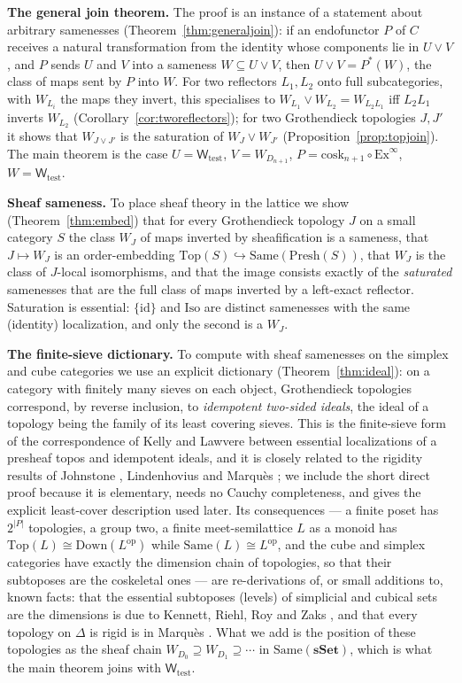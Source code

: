 \documentclass[11pt]{amsart}
\theoremstyle{definition}
\newcommand{\Same}{\mathrm{Same}}
\newcommand{\Top}{\mathrm{Top}}
\newcommand{\Iso}{\mathrm{Iso}}
\newcommand{\Presh}{\mathrm{Presh}}
\newcommand{\Down}{\mathrm{Down}}
\newcommand{\cosk}{\mathrm{cosk}}
\newcommand{\Wtest}{\mathsf{W}_{\mathrm{test}}}
\newcommand{\sset}{\mathbf{sSet}}
\begin{document}
\medskip\noindent\textbf{The general join theorem.} The proof is an instance
of a statement about arbitrary samenesses (Theorem~\ref{thm:generaljoin}):
if an endofunctor $P$ of $C$ receives a natural transformation from the
identity whose components lie in $U\vee V$, and $P$ sends $U$ and $V$ into a
sameness $W\subseteq U\vee V$, then $U\vee V=P^*(W)$, the class of maps sent
by $P$ into $W$. For two reflectors $L_1,L_2$ onto full subcategories, with
$W_{L_i}$ the maps they invert, this specialises to
$W_{L_1}\vee W_{L_2}=W_{L_2L_1}$ iff $L_2L_1$ inverts $W_{L_2}$
(Corollary~\ref{cor:tworeflectors}); for two Grothendieck topologies $J,J'$
it shows that $W_{J\vee J'}$ is the saturation of $W_J\vee W_{J'}$
(Proposition~\ref{prop:topjoin}). The main theorem is the case $U=\Wtest$,
$V=W_{D_{n+1}}$, $P=\cosk_{n+1}\circ\mathrm{Ex}^\infty$, $W=\Wtest$.

\medskip\noindent\textbf{Sheaf sameness.} To place sheaf theory in the
lattice we show (Theorem~\ref{thm:embed}) that for every Grothendieck
topology $J$ on a small category $S$ the class $W_J$ of maps inverted by
sheafification is a sameness, that $J\mapsto W_J$ is an order-embedding
$\Top(S)\hookrightarrow\Same(\Presh(S))$, that $W_J$ is the class of $J$-local
isomorphisms, and that the image consists exactly of the \emph{saturated}
samenesses that are the full class of maps inverted by a left-exact
reflector. Saturation is essential: $\{\mathrm{id}\}$ and $\Iso$ are distinct
samenesses with the same (identity) localization, and only the second is a
$W_J$.

\medskip\noindent\textbf{The finite-sieve dictionary.} To compute with sheaf
samenesses on the simplex and cube categories we use an explicit dictionary
(Theorem~\ref{thm:ideal}): on a category with finitely many sieves on each
object, Grothendieck topologies correspond, by reverse inclusion, to
\emph{idempotent two-sided ideals}, the ideal of a topology being the family
of its least covering sieves. This is the finite-sieve form of the
correspondence of Kelly and Lawvere \cite{KL89} between essential
localizations of a presheaf topos and idempotent ideals, and it is closely
related to the rigidity results of Johnstone \cite[C2.2.21]{Elephant},
Lindenhovius \cite{Lin14} and Marqu\`es \cite{Marques25}; we include the short
direct proof because it is elementary, needs no Cauchy completeness, and gives
the explicit least-cover description used later. Its consequences --- a finite
poset has $2^{|P|}$ topologies, a group two, a finite meet-semilattice $L$ as
a monoid has $\Top(L)\cong\Down(L^{\mathrm{op}})$ while $\Same(L)\cong
L^{\mathrm{op}}$, and the cube and simplex categories have exactly the
dimension chain of topologies, so that their subtoposes are the coskeletal
ones --- are re-derivations of, or small additions to, known facts: that the
essential subtoposes (levels) of simplicial and cubical sets are the
dimensions is due to Kennett, Riehl, Roy and Zaks \cite{KRRZ}, and that every
topology on $\Delta$ is rigid is in Marqu\`es \cite{Marques25}. What we add is
the position of these topologies as the sheaf chain $W_{D_0}\supseteq
W_{D_1}\supseteq\cdots$ in $\Same(\sset)$, which is what the main theorem
joins with $\Wtest$.
\end{document}
